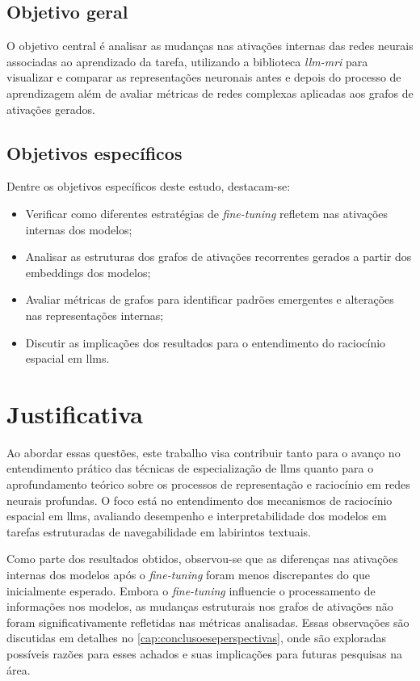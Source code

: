 \subsection{Objetivo geral}\label{subsec:objetivoGeral}

O objetivo central é analisar as mudanças nas ativações internas das redes neurais associadas ao aprendizado da tarefa, utilizando a biblioteca \textit{\gls{llm-mri}} \cite{costa2024llmmri} para visualizar e comparar as representações neuronais antes e depois do processo de aprendizagem além de avaliar métricas de redes complexas aplicadas aos grafos de ativações gerados.

\subsection{Objetivos específicos}\label{subsec:objetivosEspecificos}

Dentre os objetivos específicos deste estudo, destacam-se:

\begin{itemize}
    \item Verificar como diferentes estratégias de \textit{fine-tuning} refletem nas ativações internas dos modelos;
    \item Analisar as estruturas dos grafos de ativações recorrentes gerados a partir dos embeddings dos modelos;
    \item Avaliar métricas de grafos para identificar padrões emergentes e alterações nas representações internas; 
    \item Discutir as implicações dos resultados para o entendimento do raciocínio espacial em \gls{llms}.
\end{itemize}

\section{Justificativa}\label{sec:justificativa}

Ao abordar essas questões, este trabalho visa contribuir tanto para o avanço no entendimento prático das técnicas de especialização de \gls{llms} quanto para o aprofundamento teórico sobre os processos de representação e raciocínio em redes neurais profundas. O foco está no entendimento dos mecanismos de raciocínio espacial em \gls{llms}, avaliando desempenho e interpretabilidade dos modelos em tarefas estruturadas de navegabilidade em labirintos textuais.

Como parte dos resultados obtidos, observou-se que as diferenças nas ativações internas dos modelos após o \textit{fine-tuning} foram menos discrepantes do que inicialmente esperado. Embora o \textit{fine-tuning} influencie o processamento de informações nos modelos, as mudanças estruturais nos grafos de ativações não foram significativamente refletidas nas métricas analisadas. Essas observações são discutidas em detalhes no \autoref{cap:conclusoeseperspectivas}, onde são exploradas possíveis razões para esses achados e suas implicações para futuras pesquisas na área.

